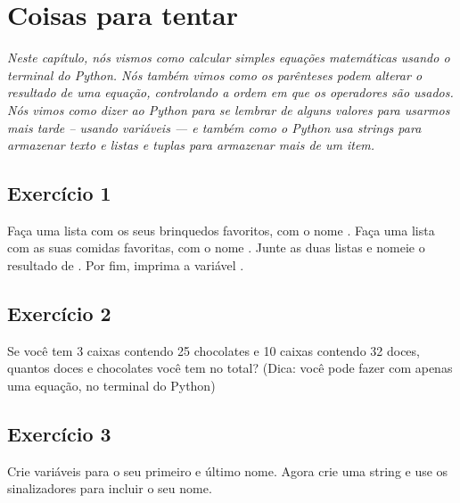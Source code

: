 \section{Coisas para tentar}

\emph{Neste capítulo, nós vismos como calcular simples equações matemáticas usando o terminal do Python. Nós também vimos como os parênteses podem alterar o resultado de uma equação, controlando a ordem em que os operadores são usados. Nós vimos como dizer ao Python para se lembrar de alguns valores para usarmos mais tarde -- usando variáveis --- e também como o Python usa strings para armazenar texto e listas e tuplas para armazenar mais de um item.}
\par

\subsection*{Exercício 1}
Faça uma lista com os seus brinquedos favoritos, com o nome . Faça uma lista com as suas comidas favoritas, com o nome . Junte as duas listas e nomeie o resultado de . Por fim, imprima a variável .

\subsection*{Exercício 2}
Se você tem 3 caixas contendo 25 chocolates e 10 caixas contendo 32 doces, quantos doces e chocolates você tem no total? (Dica: você pode fazer com apenas uma equação, no terminal do Python)

\subsection*{Exercício 3}
Crie variáveis para o seu primeiro e último nome. Agora crie uma string e use os sinalizadores para incluir o seu nome.


\newpage
